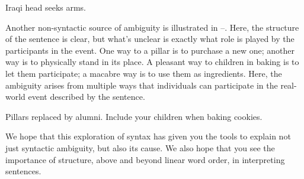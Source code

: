 \ea \label{ex:head} Iraqi head seeks arms.
\z 

Another non-syntactic source of ambiguity is illustrated in --.  Here, the structure of the sentence is clear, but what's unclear is exactly what role is played by the participants in the event.  One way to  a pillar is to purchase a new one; another way is to physically stand in its place.  A pleasant way to  children in baking is to let them participate; a macabre way is to use them as ingredients.   Here, the ambiguity arises from multiple ways that individuals can participate in the real-world event described by the sentence. 


\ea \ea \label{ex:pillars} Pillars replaced by alumni.
     \ex \label{ex:cookies} Include your children when baking cookies.
\z 
\z 

We hope that this exploration of syntax has given you the tools to explain not just syntactic ambiguity, but also its cause.  We also hope that you see the importance of structure, above and beyond linear word order, in interpreting sentences. 













